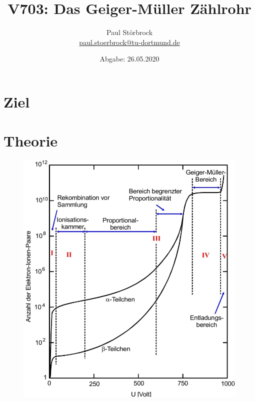 
\usepackage{tikz}

\newcommand*\circled[1]{\tikz[baseline=(char.base)]{
            \node[shape=circle,draw,inner sep=2pt] (char) {#1};}}


    \title{V703: Das Geiger-Müller Zählrohr}
    \author{  
    Paul Störbrock\\
    \texorpdfstring{\href{mailto:paul.stoerbrock@tu-dortmund.de}{paul.stoerbrock@tu-dortmund.de}}{}
    }
    \date{Abgabe: 26.05.2020\vspace{-4ex}}
\maketitle
    
\newpage
\tableofcontents
\newpage

\setcounter{page}{1}

\section{Ziel}

\section{Theorie}

    \justifying

    \begin{figure}[H]
        \centering
        \includegraphics[width=\linewidth]{images/Messbereich.jpg}
        \caption{\cite{703}}
        \label{fig:1}
    \end{figure}

